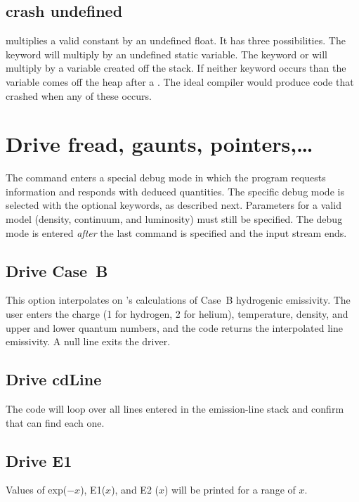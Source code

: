 \subsection{crash undefined} multiplies a valid constant
by an undefined float.
It has three possibilities.
The keyword  will multiply by an undefined
static variable.
The keyword  or  will multiply by a variable
created off the stack.
If neither keyword occurs than the variable comes
off the heap after a .
The ideal compiler would produce code that
crashed when any of these occurs.

\section{Drive fread, gaunts, pointers,\dots}

The  command enters a special debug mode
in which the program
requests information and responds with deduced quantities.
The specific
debug mode is selected with the optional keywords, as described next.
Parameters for a valid model (density, continuum, and luminosity)
must still be specified.
The debug mode is entered \emph{after} the last command is specified
and the input stream ends.

\subsection{Drive Case~B  }

This option interpolates on \citet{Storey1995}'s calculations of
Case~B hydrogenic emissivity.
The user enters the charge (1 for hydrogen,
2 for helium), temperature, density, and upper and lower quantum numbers,
and the code returns the interpolated line emissivity.
A null line exits the driver.

\subsection{Drive cdLine}

The code will loop over all lines entered in the emission-line stack
and confirm that  can find each one.

\subsection{Drive E1}

Values of exp($-x$), E1($x$), and E2 ($x$) will be printed
for a range of $x$.

